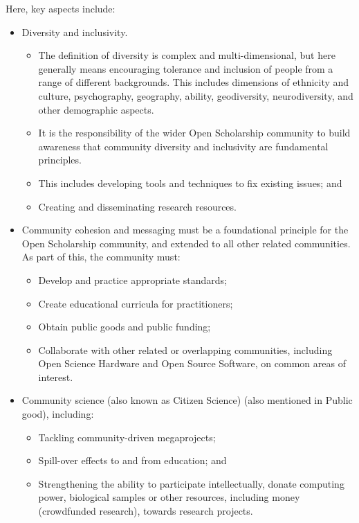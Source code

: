 \documentclass[]{article}
\begin{document}
Here, key aspects include:

\begin{itemize}
\item
  Diversity and inclusivity.

  \begin{itemize}
  \item
    The definition of diversity is complex and multi-dimensional, but
    here generally means encouraging tolerance and inclusion of people
    from a range of different backgrounds. This includes dimensions of
    ethnicity and culture, psychography, geography, ability,
    geodiversity, neurodiversity, and other demographic aspects.
  \item
    It is the responsibility of the wider Open Scholarship community to
    build awareness that community diversity and inclusivity are
    fundamental principles.
  \item
    This includes developing tools and techniques to fix existing
    issues; and
  \item
    Creating and disseminating research resources.
  \end{itemize}
\item
  Community cohesion and messaging must be a foundational principle for
  the Open Scholarship community, and extended to all other related
  communities. As part of this, the community must:

  \begin{itemize}
  \item
    Develop and practice appropriate standards;
  \item
    Create educational curricula for practitioners;
  \item
    Obtain public goods and public funding;
  \item
    Collaborate with other related or overlapping communities, including
    Open Science Hardware and Open Source Software, on common areas of
    interest.
  \end{itemize}
\item
  Community science (also known as Citizen Science) (also mentioned in
  Public good), including:

  \begin{itemize}
  \item
    Tackling community-driven megaprojects;
  \item
    Spill-over effects to and from education; and
  \item
    Strengthening the ability to participate intellectually, donate
    computing power, biological samples or other resources, including
    money (crowdfunded research), towards research projects.
  \end{itemize}
\end{itemize}
\end{document}
